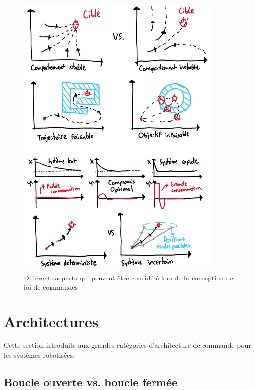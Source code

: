 \begin{figure}[htbp]
	\centering
		\includegraphics[width=0.9\textwidth]{fig/controlgoal.jpg}
	\caption{Différents aspects qui peuvent être considéré lors de la conception de loi de commandes}
	\label{fig:controlgoal}
\end{figure}


\section{Architectures}

Cette section introduits aux grandes catégories d'architecture de commande pour les systèmes robotisées. 


\subsection{Boucle ouverte vs. boucle fermée}

